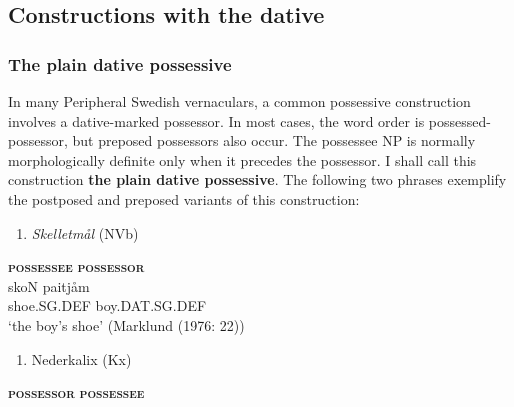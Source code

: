 \subsection[Constructions with the dative]{\rmfamily Constructions with the dative}
\label{bkm:Ref136427895}\subsubsection[The plain dative possessive]{\rmfamily The plain dative possessive}
In many Peripheral Swedish vernaculars, a common possessive construction involves a dative-marked possessor. In most cases, the word order is possessed-possessor, but preposed possessors also occur. The possessee NP is normally morphologically definite only when it precedes the possessor. I shall call this construction \textbf{the plain dative possessive}. The following two phrases exemplify the postposed and preposed variants of this construction:

\begin{enumerate} %
\item 
\textit{Skelletmål} (NVb)
\end{enumerate} %
\ea\label{}
\gll \textbf{\textsc{possessee}} \textbf{\textsc{possessor}} \\


\ea\label{}
\gll skoN  paitjåm  \\


shoe.SG.DEF  boy.DAT.SG.DEF  \\ %


‘the boy’s shoe’ (Marklund (1976: 22))
\z

\begin{enumerate} %
\item 
\label{bkm:Ref95906318}Nederkalix (Kx)

\end{enumerate} %
\ea\label{}
\gll \textbf{\textsc{possessor}} \textbf{\textsc{possessee}} \\


